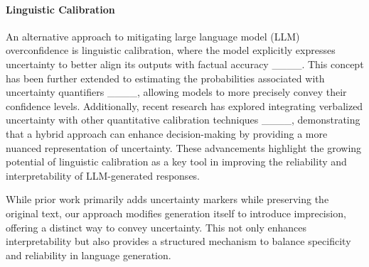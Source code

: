 \paragraph{Linguistic Calibration} An alternative approach to mitigating large language model (LLM) overconfidence is linguistic calibration, where the model explicitly expresses uncertainty to better align its outputs with factual accuracy ____. This concept has been further extended to estimating the probabilities associated with uncertainty quantifiers ____, allowing models to more precisely convey their confidence levels. Additionally, recent research has explored integrating verbalized uncertainty with other quantitative calibration techniques ____, demonstrating that a hybrid approach can enhance decision-making by providing a more nuanced representation of uncertainty. These advancements highlight the growing potential of linguistic calibration as a key tool in improving the reliability and interpretability of LLM-generated responses.

While prior work primarily adds uncertainty markers while preserving the original text, our approach modifies generation itself to introduce imprecision, offering a distinct way to convey uncertainty. This not only enhances interpretability but also provides a structured mechanism to balance specificity and reliability in language generation.